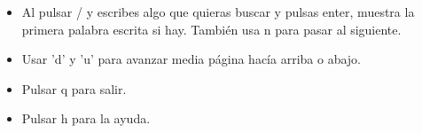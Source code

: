 	\begin{itemize}
		\item Al pulsar / y escribes algo que quieras buscar y pulsas enter, muestra la primera palabra escrita si hay. También usa n para pasar al siguiente.
		\item Usar 'd' y 'u' para avanzar media página hacía arriba o abajo.
		\item Pulsar q para salir.
		\item Pulsar h para la ayuda.
	\end{itemize}
	
	

	




